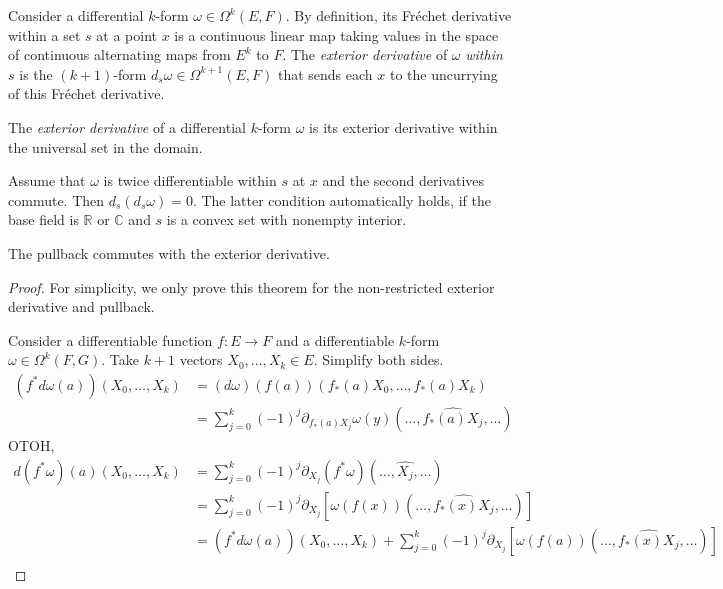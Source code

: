 \begin{definition}%
  \label{def:ederivWithin}
  Consider a differential \(k\)-form \(\omega \in \Omega^{k}(E, F)\).
  By definition, its Fréchet derivative within a set \(s\) at a point \(x\)
  is a continuous linear map taking values in the space of continuous alternating maps from \(E^{k}\) to \(F\).
  The \emph{exterior derivative} of \(\omega\) \emph{within} \(s\) is the \((k + 1)\)-form \(d_{s}\omega\in\Omega^{k + 1}(E, F)\)
  that sends each \(x\) to the uncurrying of this Fréchet derivative.
\end{definition}

\begin{definition}%
  \label{def:ederiv}
  The \emph{exterior derivative} of a differential \(k\)-form \(\omega\)
  is its exterior derivative within the universal set in the domain.
\end{definition}

\begin{theorem}
  Assume that \(\omega\) is twice differentiable within \(s\) at \(x\)
  and the second derivatives commute. Then \(d_{s}(d_{s}\omega) = 0\).
  The latter condition automatically holds, if the base field is
  \(\mathbb R\) or \(\mathbb C\) and \(s\) is a convex set with
  nonempty interior.
\end{theorem}

\begin{theorem}
  The pullback commutes with the exterior derivative.
\end{theorem}

\begin{proof}
  For simplicity, we only prove this theorem
  for the non-restricted exterior derivative and pullback.

  Consider a differentiable function \(f\colon E \to F\)
  and a differentiable \(k\)-form \(\omega\in \Omega^{k}(F, G)\).
  Take \(k+1\) vectors \(X_{0}, \dots, X_{k}\in E\).
  Simplify both sides.
  \begin{align*}
    (f^{*}d\omega(a))(X_{0}, \dots, X_{k})
    &=(d\omega)(f(a))(f_{*}(a)X_{0}, \dots, f_{*}(a)X_{k})\\
    &=\sum_{j=0}^{k}{(-1)}^{j}\partial_{f_{*}(a)X_{j}}\omega(y)(\dots, \widehat{f_{*}(a)X_{j}}, \dots)
  \end{align*}
  OTOH,
  \begin{align*}
    d(f^{*}\omega)(a)(X_{0}, \dots, X_{k})
    &=\sum_{j=0}^{k}{(-1)}^{j}\partial_{X_{j}}(f^{*}\omega)(\dots, \widehat{X_{j}}, \dots)\\
    &=\sum_{j=0}^{k}{(-1)}^{j}\partial_{X_{j}}\left[\omega(f(x))(\dots, \widehat{f_{*}(x)X_{j}}, \dots)\right]\\
    &=(f^{*}d\omega(a))(X_{0}, \dots, X_{k}) + \sum_{j=0}^{k}{(-1)}^{j}\partial_{X_{j}}\left[\omega(f(a))(\dots, \widehat{f_{*}(x)X_{j}}, \dots)\right]\\
  \end{align*}
\end{proof}

